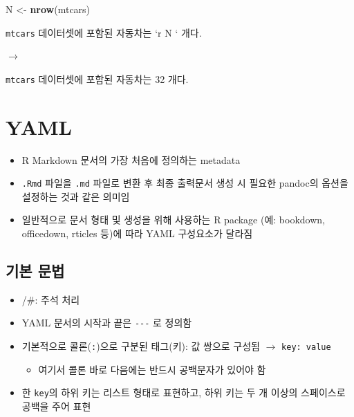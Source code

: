 \documentclass[
  11pt,
]{krantz}
\newenvironment{Shaded}{\begin{snugshade}}{\end{snugshade}}
\newcommand{\KeywordTok}[1]{\textcolor[rgb]{0.27,0.27,0.27}{\textbf{#1}}}
\newcommand{\NormalTok}[1]{#1}
\newcommand{\StringTok}[1]{\textcolor[rgb]{0.5,0.5,0.5}{#1}}
\providecommand{\tightlist}{%
  \setlength{\itemsep}{0pt}\setlength{\parskip}{0pt}}
\begin{document}
\begin{Shaded}
\begin{Highlighting}[]
\NormalTok{N <-}\StringTok{ }\KeywordTok{nrow}\NormalTok{(mtcars)}
\end{Highlighting}
\end{Shaded}

\normalsize

\texttt{mtcars} 데이터셋에 포함된 자동차는 {`}r N ` 개다.

\(\rightarrow\)

\texttt{mtcars} 데이터셋에 포함된 자동차는 32 개다.

\hypertarget{yaml}{%
\section{YAML}\label{yaml}}

\begin{itemize}
\tightlist
\item
  R Markdown 문서의 가장 처음에 정의하는 metadata
\item
  \texttt{.Rmd} 파일을 \texttt{.md} 파일로 변환 후 최종 출력문서 생성 시 필요한 pandoc의 옵션을 설정하는 것과 같은 의미임
\item
  일반적으로 문서 형태 및 생성을 위해 사용하는 R package (예: bookdown, officedown, rticles 등)에 따라 YAML 구성요소가 달라짐
\end{itemize}

\hypertarget{basic-syntax}{%
\subsection*{기본 문법}\label{basic-syntax}}


\begin{itemize}
\tightlist
\item
  /\#: 주석 처리
\item
  YAML 문서의 시작과 끝은 \texttt{-\/-\/-} 로 정의함
\item
  기본적으로 콜론(\texttt{:})으로 구분된 태그(키): 값 쌍으로 구성됨 \(\rightarrow\) \texttt{key:\ value}

  \begin{itemize}
  \tightlist
  \item
    여기서 콜론 바로 다음에는 반드시 공백문자가 있어야 함
  \end{itemize}
\item
  한 \texttt{key}의 하위 키는 리스트 형태로 표현하고, 하위 키는 두 개 이상의 스페이스로 공백을 주어 표현
\end{itemize}
\end{document}
